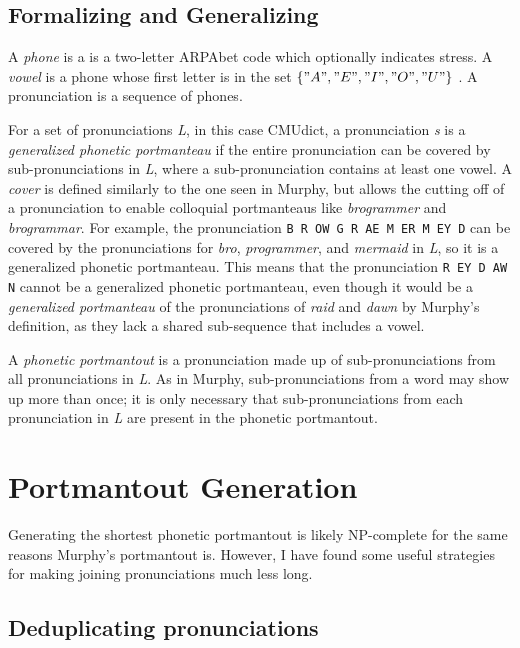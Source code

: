 \documentclass[sn-mathphys,Numbered]{sn-jnl}%
\theoremstyle{thmstyleone}%
\theoremstyle{thmstyletwo}%
\theoremstyle{thmstylethree}%
\begin{document}
\subsection{Formalizing and Generalizing}\label{subsec1}
A \textit{phone} is a is a two-letter ARPAbet code which optionally indicates stress. A \textit{vowel} is a phone whose first letter is in the set $\{"A", "E", "I", "O", "U"\}$ . A pronunciation is a sequence of phones.

For a set of pronunciations \textit{L}, in this case CMUdict, a pronunciation \textit{s} is a \textit{generalized phonetic portmanteau} if the entire pronunciation can be covered by sub-pronunciations in \textit{L}, where a sub-pronunciation contains at least one vowel. A \textit{cover} is defined similarly to the one seen in Murphy, but allows the cutting off of  a pronunciation to enable colloquial portmanteaus like \textit{brogrammer} and \textit{brogrammar}.  For example, the pronunciation \verb|B R OW G R AE M ER M EY D| can be covered by the pronunciations for \textit{bro}, \textit{programmer}, and \textit{mermaid} in \textit{L}, so it is a generalized phonetic portmanteau.  This means that the pronunciation \verb|R EY D AW N| cannot be a generalized phonetic portmanteau, even though it would be a \textit{generalized portmanteau} of the pronunciations of \textit{raid} and \textit{dawn} by Murphy's definition, as they lack a shared sub-sequence that includes a vowel.

A \textit{phonetic portmantout} is a pronunciation made up of sub-pronunciations from all pronunciations in \textit{L}. As in Murphy, sub-pronunciations from a word may show up more than once; it is only necessary that sub-pronunciations from each pronunciation in \textit{L} are present in the phonetic portmantout.

\section{Portmantout Generation}\label{sec2}

Generating the shortest phonetic portmantout is likely NP-complete for the same reasons Murphy's portmantout is. However, I have found some useful strategies for making joining pronunciations much less long.

\subsection{Deduplicating pronunciations}\label{subsec2}
\end{document}
